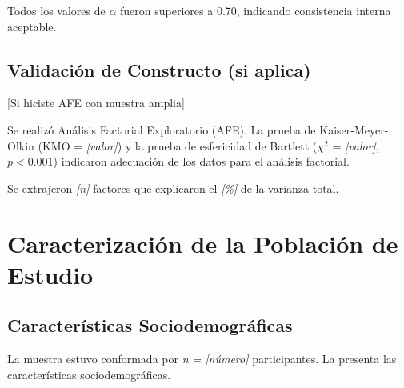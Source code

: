 Todos los valores de $\alpha$ fueron superiores a 0.70, indicando consistencia interna aceptable.

\subsection{Validación de Constructo (si aplica)}
\label{subsec:resultados_constructo}

{[Si hiciste AFE con muestra amplia]}

Se realizó Análisis Factorial Exploratorio (AFE). La prueba de Kaiser-Meyer-Olkin (KMO = \textit{{[valor]}}) y la prueba de esfericidad de Bartlett ($\chi^2$ = \textit{{[valor]}}, $p < 0.001$) indicaron adecuación de los datos para el análisis factorial.

Se extrajeron \textit{{[n]}} factores que explicaron el \textit{[\%]} de la varianza total.

\section{Caracterización de la Población de Estudio}
\label{sec:caracterizacion_poblacion}

\subsection{Características Sociodemográficas}
\label{subsec:caracteristicas_sociodemograficas}

La muestra estuvo conformada por \textit{n = {[número]}} participantes. La  presenta las características sociodemográficas.

